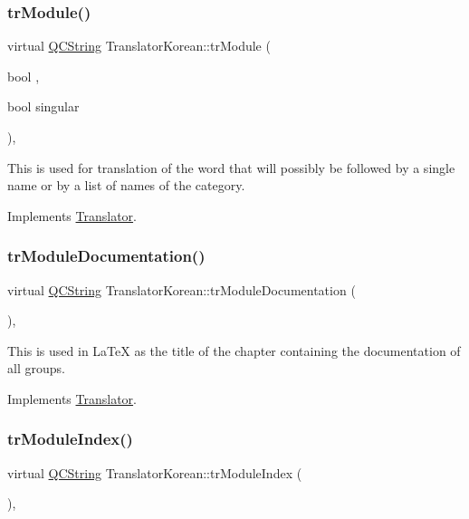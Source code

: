 \subsubsection{\texorpdfstring{trModule()}{trModule()}}
{\footnotesize\ttfamily virtual \mbox{\hyperlink{class_q_c_string}{Q\+C\+String}} Translator\+Korean\+::tr\+Module (\begin{DoxyParamCaption}\item[{bool}]{,  }\item[{bool}]{singular }\end{DoxyParamCaption})\hspace{0.3cm}{\ttfamily [inline]}, {\ttfamily [virtual]}}

This is used for translation of the word that will possibly be followed by a single name or by a list of names of the category. 

Implements \mbox{\hyperlink{class_translator}{Translator}}.

\mbox{\label{class_translator_korean_ae61a415c872901505bdc470a38aeb2a0}} 
\subsubsection{\texorpdfstring{trModuleDocumentation()}{trModuleDocumentation()}}
{\footnotesize\ttfamily virtual \mbox{\hyperlink{class_q_c_string}{Q\+C\+String}} Translator\+Korean\+::tr\+Module\+Documentation (\begin{DoxyParamCaption}{ }\end{DoxyParamCaption})\hspace{0.3cm}{\ttfamily [inline]}, {\ttfamily [virtual]}}

This is used in La\+TeX as the title of the chapter containing the documentation of all groups. 

Implements \mbox{\hyperlink{class_translator}{Translator}}.

\mbox{\label{class_translator_korean_a78c2f92238ed2dcca3456f88482b9e7c}} 
\subsubsection{\texorpdfstring{trModuleIndex()}{trModuleIndex()}}
{\footnotesize\ttfamily virtual \mbox{\hyperlink{class_q_c_string}{Q\+C\+String}} Translator\+Korean\+::tr\+Module\+Index (\begin{DoxyParamCaption}{ }\end{DoxyParamCaption})\hspace{0.3cm}{\ttfamily [inline]}, {\ttfamily [virtual]}}

